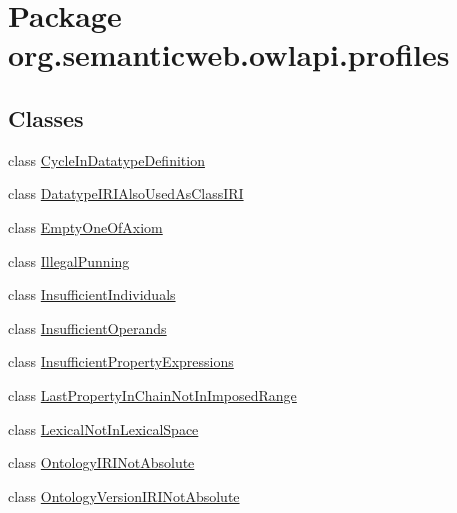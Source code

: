 \hypertarget{namespaceorg_1_1semanticweb_1_1owlapi_1_1profiles}{\section{Package org.\-semanticweb.\-owlapi.\-profiles}
\label{namespaceorg_1_1semanticweb_1_1owlapi_1_1profiles}
}
\subsection*{Classes}
\begin{DoxyCompactItemize}
\item 
class \hyperlink{classorg_1_1semanticweb_1_1owlapi_1_1profiles_1_1_cycle_in_datatype_definition}{Cycle\-In\-Datatype\-Definition}
\item 
class \hyperlink{classorg_1_1semanticweb_1_1owlapi_1_1profiles_1_1_datatype_i_r_i_also_used_as_class_i_r_i}{Datatype\-I\-R\-I\-Also\-Used\-As\-Class\-I\-R\-I}
\item 
class \hyperlink{classorg_1_1semanticweb_1_1owlapi_1_1profiles_1_1_empty_one_of_axiom}{Empty\-One\-Of\-Axiom}
\item 
class \hyperlink{classorg_1_1semanticweb_1_1owlapi_1_1profiles_1_1_illegal_punning}{Illegal\-Punning}
\item 
class \hyperlink{classorg_1_1semanticweb_1_1owlapi_1_1profiles_1_1_insufficient_individuals}{Insufficient\-Individuals}
\item 
class \hyperlink{classorg_1_1semanticweb_1_1owlapi_1_1profiles_1_1_insufficient_operands}{Insufficient\-Operands}
\item 
class \hyperlink{classorg_1_1semanticweb_1_1owlapi_1_1profiles_1_1_insufficient_property_expressions}{Insufficient\-Property\-Expressions}
\item 
class \hyperlink{classorg_1_1semanticweb_1_1owlapi_1_1profiles_1_1_last_property_in_chain_not_in_imposed_range}{Last\-Property\-In\-Chain\-Not\-In\-Imposed\-Range}
\item 
class \hyperlink{classorg_1_1semanticweb_1_1owlapi_1_1profiles_1_1_lexical_not_in_lexical_space}{Lexical\-Not\-In\-Lexical\-Space}
\item 
class \hyperlink{classorg_1_1semanticweb_1_1owlapi_1_1profiles_1_1_ontology_i_r_i_not_absolute}{Ontology\-I\-R\-I\-Not\-Absolute}
\item 
class \hyperlink{classorg_1_1semanticweb_1_1owlapi_1_1profiles_1_1_ontology_version_i_r_i_not_absolute}{Ontology\-Version\-I\-R\-I\-Not\-Absolute}

\end{DoxyCompactItemize}
